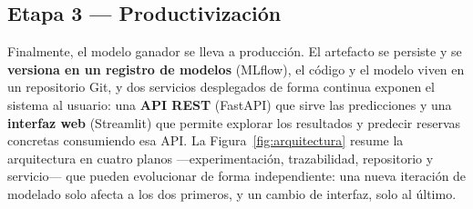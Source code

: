 \documentclass[10pt,twocolumn,a4paper]{article}
\begin{document}
\subsection{Etapa 3 --- Productivización}

Finalmente, el modelo ganador se lleva a producción. El artefacto se persiste y se
\textbf{versiona en un registro de modelos} (MLflow), el código y el modelo viven en
un repositorio Git, y dos servicios desplegados de forma continua exponen el sistema
al usuario: una \textbf{API REST} (FastAPI) que sirve las predicciones y una
\textbf{interfaz web} (Streamlit) que permite explorar los resultados y predecir
reservas concretas consumiendo esa API. La Figura~\ref{fig:arquitectura} resume la
arquitectura en cuatro planos ---experimentación, trazabilidad, repositorio y
servicio--- que pueden evolucionar de forma independiente: una nueva iteración de
modelado solo afecta a los dos primeros, y un cambio de interfaz, solo al último.
\end{document}
